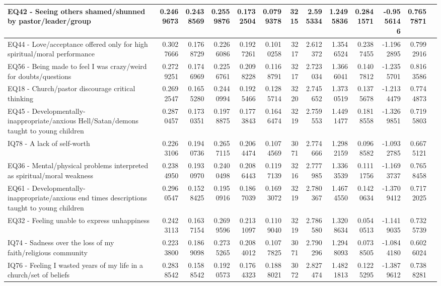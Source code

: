 \documentclass[
  letterpaper,
]{article}
\begin{document}
\begin{table}
\begin{tabular}{l|r|r|r|r|r|r|r|r|r|r|r|l}
\hline
EQ42 - Seeing others shamed/shunned by pastor/leader/group & 0.2469673 & 0.2438569 & 0.2559876 & 0.1732504 & 0.0799378 & 3215 & 2.595334 & 1.2495836 & 0.2841571 & -0.9556146 & 0.7657871 & \\
\hline
EQ44 - Love/acceptance offered only for high spiritual/moral performance & 0.3027666 & 0.1768729 & 0.2266086 & 0.1927261 & 0.1010258 & 3217 & 2.612372 & 1.3546524 & 0.2387455 & -1.1962895 & 0.7992916 & \\
\hline
EQ56 - Being made to feel I was crazy/weird for doubts/questions & 0.2729251 & 0.1746969 & 0.2256761 & 0.2098228 & 0.1168791 & 3217 & 2.723034 & 1.3666041 & 0.1407812 & -1.2355701 & 0.8163586 & \\
\hline
EQ18 - Church/pastor discourage critical thinking & 0.2692547 & 0.1655280 & 0.2440994 & 0.1925466 & 0.1285714 & 3220 & 2.745652 & 1.3730519 & 0.1375678 & -1.2134479 & 0.7744873 & \\
\hline
EQ45 - Developmentally-inappropriate/anxious Hell/Satan/demons taught to young children & 0.2870457 & 0.1730351 & 0.1978875 & 0.1773843 & 0.1646474 & 3219 & 2.759553 & 1.4491477 & 0.1818558 & -1.3269851 & 0.7195803 & \\
\hline
IQ78 - A lack of self-worth & 0.2263106 & 0.1940736 & 0.2657115 & 0.2064474 & 0.1074569 & 3071 & 2.774666 & 1.2982159 & 0.0968582 & -1.0932785 & 0.6675121 & \\
\hline
EQ36 - Mental/physical problems interpreted as spiritual/moral weakness & 0.2384950 & 0.1930970 & 0.2400498 & 0.2086443 & 0.1197139 & 3216 & 2.777985 & 1.3363539 & 0.1111756 & -1.1693737 & 0.7658458 & \\
\hline
EQ61 - Developmentally-inappropriate/anxious end times descriptions taught to young children & 0.2960547 & 0.1528425 & 0.1950916 & 0.1867039 & 0.1693072 & 3219 & 2.780367 & 1.4674550 & 0.1420634 & -1.3709412 & 0.7172025 & \\
\hline
EQ32 - Feeling unable to express unhappiness & 0.2423113 & 0.1637154 & 0.2699596 & 0.2131097 & 0.1109040 & 3219 & 2.786580 & 1.3208634 & 0.0540513 & -1.1419035 & 0.7325739 & \\
\hline
IQ74 - Sadness over the loss of my faith/religious community & 0.2233800 & 0.1869098 & 0.2735265 & 0.2084012 & 0.1077825 & 3071 & 2.790296 & 1.2948093 & 0.0738505 & -1.0844180 & 0.6026024 & \\
\hline
IQ76 - Feeling I wasted years of my life in a church/set of beliefs & 0.2838542 & 0.1588542 & 0.1920573 & 0.1764323 & 0.1888021 & 3072 & 2.827474 & 1.4821813 & 0.1225295 & -1.3879612 & 0.7388281 & \\

\end{tabular}
\end{table}
\end{document}
